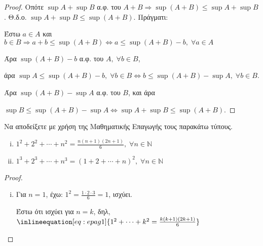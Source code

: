 \begin{multicols}{2}
\begin{enumerate}
\begin{proof}
            Οπότε $ \sup A + \sup B $ α.φ. του $ A + B \Rightarrow \sup (A+B) \leq 
            \sup A + \sup B$.
            Θ.δ.ο. $ \sup A + \sup B \leq \sup (A+B) $. Πράγματι:

            Έστω $ a \in A $ και $ b \in B \Rightarrow a+b \leq \sup (A+B) 
            \Leftrightarrow a \leq \sup (A+B) - b, \; \forall a \in A $ 
            
            Άρα $ \sup (A+B) - b $ α.φ. του $A, \; \forall b \in B $, 

            άρα $ \sup A \leq \sup (A+B) - b, \; \forall b \in B \Leftrightarrow 
            b \leq \sup (A+B) - \sup A , \; \forall b \in B$. 

            Άρα $ \sup (A+B) - \sup A $ α.φ. του $B$, και άρα 

            $ \sup B \leq \sup (A+B) - \sup A \Leftrightarrow \sup A + \sup B \leq 
            \sup (A+B)$.
        \end{proof}


    \item Να αποδείξετε με χρήση της Μαθηματικής Επαγωγής τους παρακάτω τύπους.
        \begin{enumerate}[i)]
            \item $ 1^{2} + 2^{2} + \cdots + n^{2} = \frac{n(n+1)(2n+1)}{6}, \; 
                \forall n \in \mathbb{N} $
            \item $ 1^{3} + 2^{3} + \cdots + n^{3} = (1+2+\cdots + n)^{2}, \; 
                \forall n \in \mathbb{N} $
        \end{enumerate}

        \begin{proof}
        \item {}
            \begin{enumerate}[i)]
                \item Για $ n=1 $, έχω: $ 1^{2} = \frac{1\cdot 2 \cdot 3}{6} = 1 $, 
                    ισχύει.

                Έστω ότι ισχύει για $n=k$, δηλ, 
                    $ \inlineequation[eq:epag1]{1^{2} + \cdots + k^{2} = 
                    \frac{k (k+1)(2k+1)}{6}} $


\end{enumerate}
\end{proof}
\end{enumerate}
\end{multicols}
